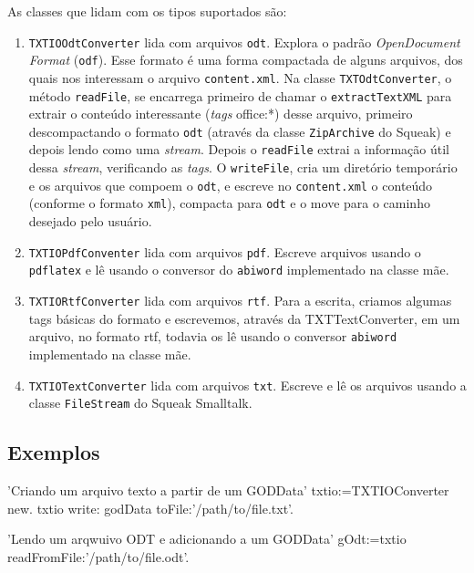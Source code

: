 As classes que lidam com os tipos suportados são:
\begin{enumerate}
\item \verb|TXTIOOdtConverter| lida com arquivos \verb|odt|. Explora o
  padrão \textit{OpenDocument Format} (\verb|odf|). Esse formato é uma
  forma compactada de alguns arquivos, dos quais nos interessam o
  arquivo \verb|content.xml|. Na classe \verb|TXTOdtConverter|, o
  método \verb|readFile|, se encarrega primeiro de chamar o
  \verb|extractTextXML| para extrair o conteúdo interessante
  (\textit{tags} office:*) desse arquivo, primeiro descompactando o
  formato \verb|odt| (através da classe \verb|ZipArchive| do Squeak) e
  depois lendo como uma \textit{stream}. Depois o \verb|readFile|
  extrai a informação útil dessa \textit{stream}, verificando as
  \textit{tags}. O \verb|writeFile|, cria um diretório temporário e os
  arquivos que compoem o \verb|odt|, e escreve no \verb|content.xml| o
  conteúdo (conforme o formato \verb|xml|), compacta para \verb|odt| e
  o move para o caminho desejado pelo usuário.
\item \verb|TXTIOPdfConventer| lida com arquivos \verb|pdf|. Escreve
  arquivos usando o \verb|pdflatex| e lê usando o conversor do
  \verb|abiword| implementado na classe mãe.
\item \verb|TXTIORtfConverter| lida com arquivos \verb|rtf|. Para a
  escrita, criamos algumas tags básicas do formato e escrevemos,
  através da TXTTextConverter, em um arquivo, no formato rtf, todavia
  os lê usando o conversor \verb|abiword| implementado na classe mãe.
\item \verb|TXTIOTextConverter| lida com arquivos \verb|txt|. Escreve
  e lê os arquivos usando a classe \verb|FileStream| do Squeak
  Smalltalk.
\end{enumerate}

\subsection{Exemplos}

\begin{godCode}
'Criando um arquivo texto a partir de um GODData' 
txtio:=TXTIOConverter new.
txtio write: godData toFile:'/path/to/file.txt'.

'Lendo um arqwuivo ODT e adicionando a um GODData'
gOdt:=txtio readFromFile:'/path/to/file.odt'.

\end{godCode}
